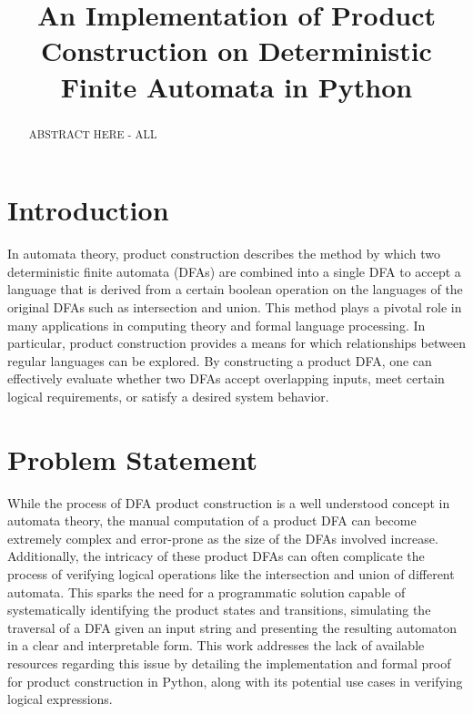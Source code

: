 \documentclass[conference]{IEEEtran}
\begin{document}
\title{An Implementation of Product Construction on Deterministic Finite Automata in Python}

\author{
\and
{}
\and
{}
}

\maketitle

\begin{abstract}
ABSTRACT HERE - ALL
\end{abstract}

\section{Introduction}
In automata theory, product construction describes the method by which two deterministic finite automata (DFAs) are combined into a single DFA to accept a language that is derived from a certain boolean operation on the languages of the original DFAs such as intersection and union. This method plays a pivotal role in many applications in computing theory and formal language processing. In particular, product construction provides a means for which relationships between regular languages can be explored. By constructing a product DFA, one can effectively evaluate whether two DFAs accept overlapping inputs, meet certain logical requirements, or satisfy a desired system behavior.

\section{Problem Statement}
While the process of DFA product construction is a well understood concept in automata theory, the manual computation of a product DFA can become extremely complex and error-prone as the size of the DFAs involved increase. Additionally, the intricacy of these product DFAs can often complicate the process of verifying logical operations like the intersection and union of different automata. This sparks the need for a programmatic solution capable of systematically identifying the product states and transitions, simulating the traversal of a DFA given an input string and presenting the resulting automaton in a clear and interpretable form. This work addresses the lack of available resources regarding this issue by detailing the implementation and formal proof for product construction in Python, along with its potential use cases in verifying logical expressions.
\end{document}
